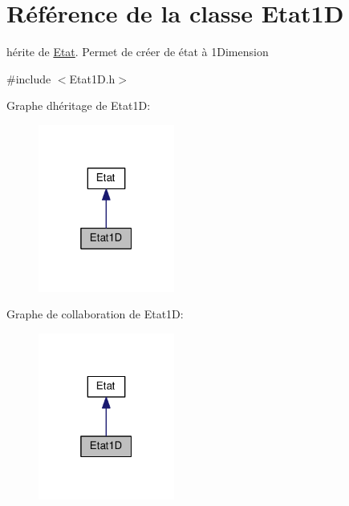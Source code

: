\hypertarget{class_etat1_d}{}\section{Référence de la classe Etat1D}
\label{class_etat1_d}


hérite de \hyperlink{class_etat}{Etat}. Permet de créer de état à 1\+Dimension  




{\ttfamily \#include $<$Etat1\+D.\+h$>$}



Graphe d\textquotesingle{}héritage de Etat1D\+:
\nopagebreak
\begin{figure}[H]
\begin{center}
\leavevmode
\includegraphics[width=127pt]{class_etat1_d__inherit__graph}
\end{center}
\end{figure}


Graphe de collaboration de Etat1D\+:
\nopagebreak
\begin{figure}[H]
\begin{center}
\leavevmode
\includegraphics[width=127pt]{class_etat1_d__coll__graph}
\end{center}
\end{figure}
